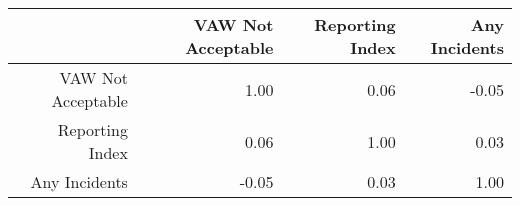 \begin{tabular}{rrrr}
  \hline
 & VAW Not Acceptable & Reporting Index & Any Incidents \\ 
  \hline
VAW Not Acceptable & 1.00 & 0.06 & -0.05 \\ 
  Reporting Index & 0.06 & 1.00 & 0.03 \\ 
  Any Incidents & -0.05 & 0.03 & 1.00 \\ 
   \hline
\end{tabular}
